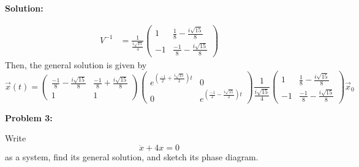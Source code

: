 \documentclass[12pt]{article}
\newenvironment{problem}[1]{
    \textbf{Problem #1:}
}{
    \rmfamily \vspace{1em}
}
\newenvironment{solution}{
    \textbf{Solution:}
    
}{
    
    \vspace{2em}
}
\begin{document}
\begin{solution}
\[\begin{aligned}
            V^{-1} &= \frac{1}{\frac{i\sqrt{15}}{4}}\begin{pmatrix} 1 & \frac{1}{8} - \frac{i\sqrt{15}}{8} \\ -1 & \frac{-1}{8} - \frac{i\sqrt{15}}{8} \end{pmatrix}
        \end{aligned}
    \]
    Then, the general solution is given by
    \[
        \vec{x}(t) = \begin{pmatrix} \frac{-1}{8} - \frac{i\sqrt{15}}{8} & \frac{-1}{8} + \frac{i\sqrt{15}}{8} \\ 1 & 1 \end{pmatrix}\begin{pmatrix} e^{\left(\frac{-1}{2} + \frac{i\sqrt{15}}{2}\right)t} & 0 \\ 0 & e^{\left(\frac{-1}{2} - \frac{i\sqrt{15}}{2}\right)t} \end{pmatrix} \frac{1}{\frac{i\sqrt{15}}{4}}\begin{pmatrix} 1 & \frac{1}{8} - \frac{i\sqrt{15}}{8} \\ -1 & \frac{-1}{8} - \frac{i\sqrt{15}}{8} \end{pmatrix} \vec{x}_0
    \]
\end{solution}

\newpage

\begin{problem}{3}
    Write
    \[
        \ddot{x} + 4x = 0
    \]
    as a system, find its general solution, and sketch its phase diagram.
\end{problem}
\end{document}

